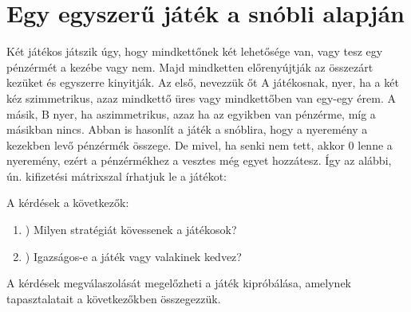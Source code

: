 \documentclass  {article}
\begin{document}
 

\section{Egy egyszerű játék a snóbli alapján}
 
Két játékos játszik úgy, hogy mindkettőnek két lehetősége van, vagy tesz egy pénzérmét a kezébe vagy nem. Majd mindketten előrenyújtják az összezárt kezüket és egyszerre kinyitják. Az első, nevezzük őt A játékosnak, nyer, ha a két kéz szimmetrikus, azaz mindkettő üres vagy mindkettőben van egy-egy érem. A másik, B nyer, ha aszimmetrikus, azaz ha az egyikben van pénzérme, míg a másikban nincs. Abban is hasonlít a játék a snóblira, hogy a nyeremény a kezekben levő pénzérmék összege. De mivel, ha senki nem tett, akkor 0 lenne a nyeremény, ezért a pénzérmékhez a vesztes még egyet hozzátesz. Így az alábbi, ún. kifizetési mátrixszal írhatjuk le a játékot:


 A kérdések a következők:\\
\begin{enumerate}[i]
	\item ) Milyen stratégiát kövessenek a játékosok?
	\item ) Igazságos-e a játék vagy valakinek kedvez?
\end{enumerate}

A kérdések megválaszolását megelőzheti a játék kipróbálása, amelynek tapasztalatait a következőkben összegezzük.
\end{document}
